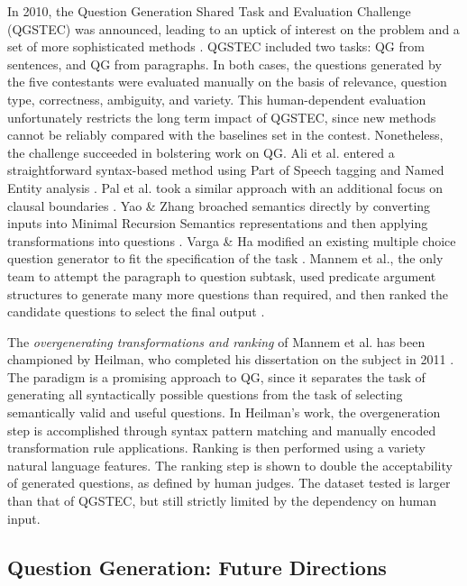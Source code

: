 In 2010, the Question Generation Shared Task and Evaluation Challenge (QGSTEC) was announced, leading to an uptick of interest on the problem and a set of more sophisticated methods  \citep{rus2011question}. QGSTEC included two tasks: QG from sentences, and QG from paragraphs. In both cases, the questions generated by the five contestants were evaluated manually on the basis of relevance, question type, correctness, ambiguity, and variety. This human-dependent evaluation unfortunately restricts the long term impact of QGSTEC, since new methods cannot be reliably compared with the baselines set in the contest. Nonetheless, the challenge succeeded in bolstering work on QG. Ali et al. entered a straightforward syntax-based method using Part of Speech tagging and Named Entity analysis  \citep{ali2010automatic}. Pal et al. took a similar approach with an additional focus on clausal boundaries  \citep{pal2010qgstec}. Yao \& Zhang broached semantics directly by converting inputs into Minimal Recursion Semantics representations and then applying transformations into questions  \citep{yao2010question}. Varga \& Ha modified an existing multiple choice question generator to fit the specification of the task  \citep{vargaha}. Mannem et al., the only team to attempt the paragraph to question subtask, used predicate argument structures to generate many more questions than required, and then ranked the candidate questions to select the final output  \citep{mannem2010question}. 

The \textit{overgenerating transformations and ranking} of Mannem et al. has been championed by Heilman, who completed his dissertation on the subject in 2011  \citep{heilman2010extracting, heilman2010good, heilman2011automatic}. The paradigm is a promising approach to QG, since it separates the task of generating all syntactically possible questions from the task of selecting semantically valid and useful questions. In Heilman's work, the overgeneration step is accomplished through syntax pattern matching and manually encoded transformation rule applications. Ranking is then performed using a variety natural language features. The ranking step is shown to double the acceptability of generated questions, as defined by human judges. The dataset tested is larger than that of QGSTEC, but still strictly limited by the dependency on human input.

\subsection{Question Generation: Future Directions}

